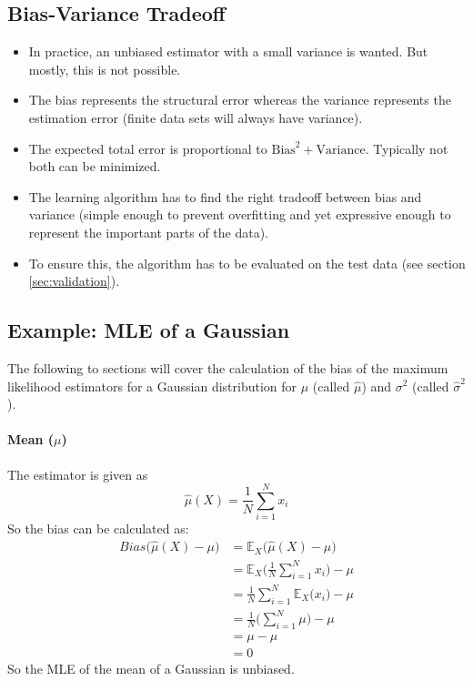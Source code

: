 \documentclass[a4paper, 11pt, accentcolor = tud3b]{tudreport}
\newcommand{\E}{\ensuremath{\mathbb{E}}}
\newcommand{\Bias}{\ensuremath{\textit{Bias}}}
\begin{document}
			\subsection{Bias-Variance Tradeoff}
				\begin{itemize}
					\item In practice, an unbiased estimator with a small variance is wanted. But mostly, this is not possible.
					\item The bias represents the structural error whereas the variance represents the estimation error (finite data sets will always have variance).
					\item The expected total error is proportional to \( \textrm{Bias}^2 + \textrm{Variance} \). Typically not both can be minimized.
					\item The learning algorithm has to find the right tradeoff between bias and variance (simple enough to prevent overfitting and yet expressive enough to represent the important parts of the data).
					\item To ensure this, the algorithm has to be evaluated on the test data (see section \ref{sec:validation}).
				\end{itemize}

			\subsection{Example: MLE of a Gaussian} %
				The following to sections will cover the calculation of the bias of the maximum likelihood estimators for a Gaussian distribution for \(\mu\) (called \(\hat{\mu}\)) and \(\sigma^2\) (called \(\hat{\sigma}^2\)).

				\paragraph{Mean (\(\mu\))}
					The estimator is given as
					\begin{equation}
						\hat{\mu}(X) = \frac{1}{N} \sum_{i = 1}^{N} x_i
					\end{equation}
					So the bias can be calculated as:
					\begin{align}
						\Bias\big(\hat{\mu}(X) - \mu\big) &= \E_X\big(\hat{\mu}(X) - \mu\big) \\
							&= \E_X\Bigg( \frac{1}{N} \sum_{i = 1}^{N} x_i \Bigg) - \mu \\
							&= \frac{1}{N} \sum_{i = 1}^{N} \E_X\big(x_i\big) - \mu \\
							&= \frac{1}{N} \Bigg( \sum_{i = 1}^{N} \mu \Bigg) - \mu \\
							&= \mu - \mu \\
							&= 0
					\end{align}
					So the MLE of the mean of a Gaussian is unbiased.
\end{document}

